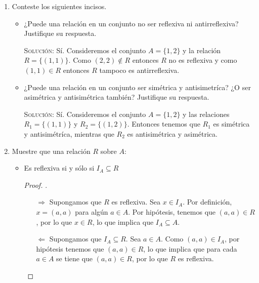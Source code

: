 \documentclass[letterpaper,11pt]{article}
\begin{document}
\begin{enumerate}
    \item Conteste los siguientes incisos.
    \begin{itemize}
        \item ¿Puede una relación en un conjunto no ser reflexiva ni
        antirreflexiva? Justifique su respuesta.

        \textsc{Solución:} Sí. Consideremos el conjunto $A = \{1, 2\}$ y la 
        relación $R = \{(1,1)\}$. Como $(2,2) \not \in R$ entonces $R$ no es 
        reflexiva y como $(1, 1) \in R$ entonces $R$ tampoco es antirreflexiva.

        \item ¿Puede una relación en un conjunto ser simétrica y 
        antisimetríca? ¿O ser asimétrica y antisimétrica también? Justifique su
        respuesta.  
        
        \textsc{Solución:} Sí. Consideremos el conjunto $A = \{1, 2\}$ y las 
        relaciones $R_{1} = \{(1,1)\}$ y $R_{2} = \{(1,2)\}$. Entonces tenemos 
        que $R_{1}$ es simétrica y antisimétríca, mientras que $R_{2}$ es 
        antisimétrica y asimétrica. 
    \end{itemize}

    \item Muestre que una relación $R$ sobre $A$:
    \begin{itemize}
        \item Es reflexiva si y sólo si $I_{A} ⊆ R$

        \begin{proof} .
            \begin{itemize}
                \item[$⇒$] Supongamos que $R$ es reflexiva. Sea $x \in I_{A}$.
                Por definición, $x = (a, a)$ para algún $a \in A$. Por 
                hipótesis, tenemos que $(a, a) \in R$, por lo que $x \in R$, 
                lo que implica que $I_{A} ⊆ A$.

                \item[$⇐$] Supongamos que $I_{A} ⊆ R$. Sea $a \in A$. Como 
                $(a, a) \in I_{A}$, por hipótesis tenemos que $(a, a) \in R$,
                lo que implica que para cada $a \in A$ se tiene que 
                $(a, a) \in R$, por lo que $R$ es reflexiva. 
            \end{itemize}
        \end{proof}


\end{itemize}
\end{enumerate}
\end{document}
